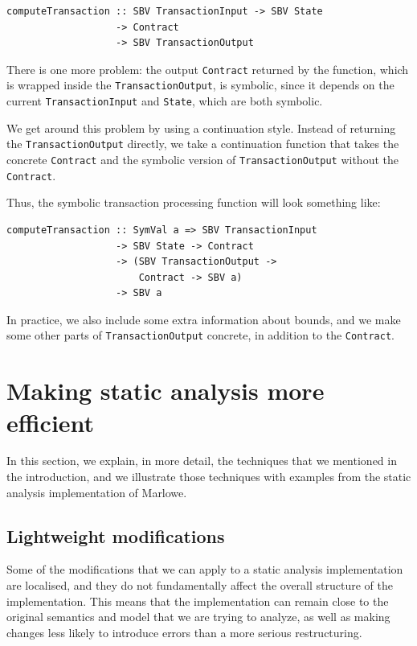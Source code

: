 \documentclass[english,runningheads]{llncs}
\begin{document}
\begin{verbatim}
computeTransaction :: SBV TransactionInput -> SBV State
                   -> Contract
                   -> SBV TransactionOutput
\end{verbatim}

There is one more problem: the output \texttt{Contract} returned
by the function, which is wrapped inside the \texttt{TransactionOutput},
is symbolic, since it depends on the current \texttt{TransactionInput}
and \texttt{State}, which are both symbolic.

We get around this problem by using a continuation style. Instead
of returning the \texttt{TransactionOutput} directly, we take a continuation
function that takes the concrete \texttt{Contract} and the symbolic version
of \texttt{TransactionOutput} without the \texttt{Contract}.

Thus, the symbolic transaction processing function will look something
like:

\begin{verbatim}
computeTransaction :: SymVal a => SBV TransactionInput
                   -> SBV State -> Contract
                   -> (SBV TransactionOutput ->
                       Contract -> SBV a)
                   -> SBV a
\end{verbatim}

In practice, we also include some extra information about bounds,
and we make some other parts of \texttt{TransactionOutput} concrete,
in addition to the \texttt{Contract}.

\section{Making static analysis more efficient\label{sec:Making-static-analysis-efficient}}

In this section, we explain, in more detail, the techniques that we mentioned
in the introduction, and we illustrate those techniques with
examples from the static analysis implementation of Marlowe.

\subsection{Lightweight modifications\label{subsec:Lightweight-modifications}}

Some of the modifications that we can apply to a static analysis implementation
are localised, and they do not fundamentally affect the overall structure
of the implementation. This means that the implementation can remain close
to the original semantics and model that we are
trying to analyze, as well as making changes less likely to introduce
errors than a more serious restructuring.
\end{document}
